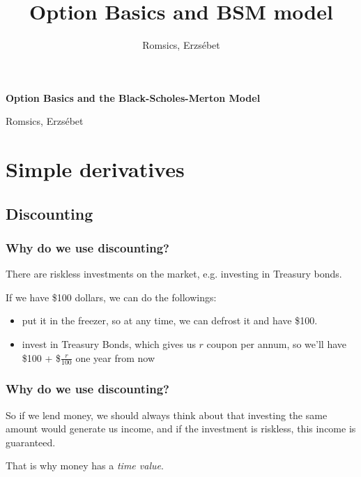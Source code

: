\documentclass[ignorenonframetext, 9pt]{beamer}
\title{Option Basics and BSM model}
\subtitle{}
\author{Romsics, Erzsébet}
\begin{document}
\begin{frame}
	\begin{center}
	\textcolor{temablue}{\Large \textbf{Option Basics and the Black-Scholes-Merton Model}\\}
	
	\vspace*{1cm}
	\large Romsics, Erzsébet
	\end{center}
\end{frame}

\frame{\tableofcontents}

\section{Simple derivatives}

\subsection{Discounting}

\begin{frame}
\frametitle{Why do we use discounting?}

\pause

There are riskless investments on the market, e.g. investing in Treasury bonds. \newline


If we have \$100 dollars, we can do the followings:
\begin{itemize}
\item put it in the freezer, so at any time, we can defrost it and have \$100.
\item invest in Treasury Bonds, which gives us $r$ coupon per annum, so we'll have \$100 + \$$\frac{r}{100}$ one year from now
\end{itemize}

\end{frame}

\begin{frame}
\frametitle{Why do we use discounting?}

So if we lend money, we should always think about that investing the same amount would generate us income, and if the investment is riskless, this income is guaranteed. \newline

That is why money has a \textit{time value}.
\end{frame}
\end{document}
